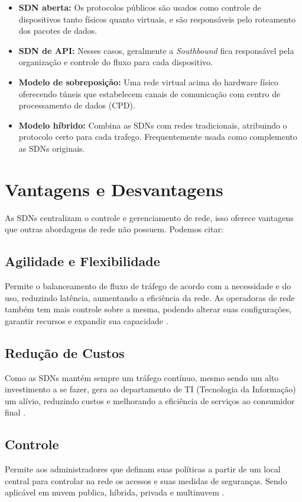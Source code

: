 \begin{itemize}
	\item \textbf{SDN aberta:} Os protocolos públicos são usados como controle de dispositivos tanto físicos quanto virtuais, e são
	responsáveis pelo roteamento dos pacotes de dados.
	\item \textbf{SDN de API:} Nesses casos, geralmente a \textit{Southbound} fica responsável pela organização e controle do fluxo para
	cada dispositivo.
	\item \textbf{Modelo de sobreposição:} Uma rede virtual acima do hardware físico oferecendo túneis que estabelecem canais de comunicação
	com centro de processamento de dados (CPD).
	\item \textbf{Modelo híbrido:} Combina as SDNs com redes tradicionais, atribuindo o protocolo certo para cada trafego. Frequentemente usada como complemento as SDNs originais.
\end{itemize}
\cite{ibm_sdn}

\section{Vantagens e Desvantagens}
As SDNs centralizam o controle e gerenciamento de rede, isso oferece vantagens que outras abordagens de rede não possuem.
Podemos citar:

\subsection{Agilidade e Flexibilidade}
Permite o balanceamento de fluxo de tráfego de acordo com a necessidade e do uso, reduzindo latência, aumentando a eficiência da rede.
As operadoras de rede também tem mais controle sobre a mesma, podendo alterar suas configurações, garantir recursos e expandir sua capacidade
\cite{ibm_sdn}.

\subsection{Redução de Custos}
Como as SDNs mantém sempre um tráfego contínuo, mesmo sendo um alto investimento a se fazer, gera ao departamento de TI (Tecnologia
da Informação) um alívio, reduzindo custos e melhorando a eficiência de serviços ao consumidor final \cite{stefanini_performance2025}.

\subsection{Controle}
Permite aos administradores que definam suas políticas a partir de um local central para controlar na rede os acessos e suas medidas
de seguranças. Sendo aplicável em nuvem publica, híbrida, privada e multinuvem \cite{ibm_sdn, stefanini_performance2025}.

